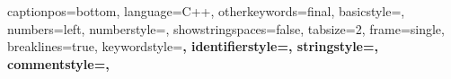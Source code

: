  {
    captionpos=bottom,
    language=C++,
    otherkeywords={final},
    basicstyle=\footnotesize,
    numbers=left,
    numberstyle=\small,
    showstringspaces=false,
    tabsize=2,
    frame=single,
    breaklines=true,
    keywordstyle=\bfseries\color[RGB]{127,0,85},
    identifierstyle=\color[RGB]{0,0,192},
    stringstyle=\color[RGB]{42,0,255},
    commentstyle=\color[RGB]{63,127,95},
}


\usepackage[ruled, vlined, linesnumbered]{algorithm2e}
\DontPrintSemicolon
{}

\usepackage[bookmarks=false]{hyperref}
\hypersetup{
    colorlinks,
    citecolor=black,
    filecolor=black,
    linkcolor=black,
    urlcolor=black
}
\def\chapterautorefname{Chapter}
\def\sectionautorefname{Section}
\def\subsectionautorefname{Subsection}
\def\algorithmautorefname{Algorithm}
\def\subfigureautorefname{Figure}

